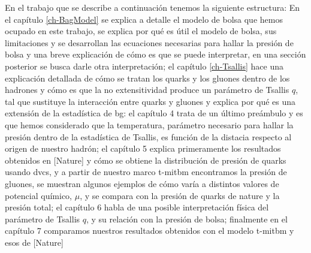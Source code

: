 En el trabajo que se describe a continuación tenemos la siguiente estructura: En el capítulo \ref{ch-BagModel} se explica a detalle el modelo de bolsa que hemos ocupado en este trabajo, se explica por qué es útil el modelo de bolsa, sus limitaciones y se desarrollan las ecuaciones necesarias para hallar la presión de bolsa y una breve explicación de cómo es que se puede interpretar, en una sección posterior se busca darle otra interpretación; el capítulo \ref{ch-Tsallis} hace una explicación detallada de cómo se tratan los quarks y los gluones dentro de los hadrones y cómo es que la no extensitividad produce un parámetro de Tsallis $q$, tal que sustituye la interacción entre quarks y gluones y explica por qué es una extensión de la estadística de \acrfull{bg}: el capítulo 4 trata de un último preámbulo y es que hemos considerado que la temperatura, parámetro necesario para hallar la presión dentro de la estadística de Tsallis, es función de la distacia respecto al origen de nuestro hadrón; el capítulo 5 explica primeramente los resultados obtenidos en [Nature] y cómo se obtiene la distribución de presión de quarks usando \acrshort{dvcs}, y a partir de nuestro marco \acrshort{t-mitbm} encontramos la presión de gluones, se muestran algunos ejemplos de cómo varía a distintos valores de potencial químico, $\mu$, y se compara con la presión de quarks de nature y la presión total; el capítulo 6 habla de una posible interpretación física del parámetro de Tsallis $q$, y su relación con la presión de bolsa; finalmente en el capítulo 7 comparamos nuestros resultados obtenidos con el modelo \acrshort{t-mitbm} y esos de [Nature]

\newpage

\thispagestyle{empty}